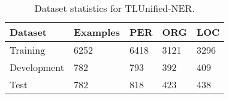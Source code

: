 \documentclass[../emnlp.tex]{subfiles}
\begin{document}
\begin{table}[t]
\begin{tabular}{@{}lllll@{}}
\toprule
Dataset     & Examples & PER  & ORG  & LOC  \\ \midrule
Training    & 6252     & 6418 & 3121 & 3296 \\
Development & 782      & 793  & 392  & 409  \\
Test        & 782      & 818  & 423  & 438  \\ \bottomrule
\end{tabular}
\caption{Dataset statistics for TLUnified-NER.}
\label{table:dset_stats}
\end{table}
\end{document}
